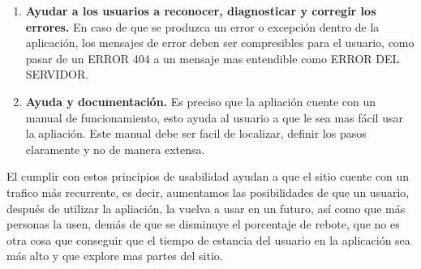 \begin{enumerate}
	\item \textbf{Ayudar a los usuarios a reconocer, diagnosticar y corregir los errores.} En caso de que se produzca un error o excepción dentro de la aplicación, los mensajes de error deben ser compresibles para el usuario, como pasar de un ERROR 404 a un mensaje mas entendible como ERROR DEL SERVIDOR.
	
	\item \textbf{Ayuda y documentación.} Es preciso que la apliación cuente con un manual de funcionamiento, esto ayuda al usuario a que le sea mas fácil usar la apliación. Este manual debe ser facil de localizar, definir los pasos claramente y no de manera extensa.
\end{enumerate}

El cumplir con estos principios de usabilidad ayudan a que el sitio cuente con un trafico más recurrente, es decir, aumentamos las posibilidades de que un usuario, después de utilizar la apliación, la vuelva a usar en un futuro, así como que más personas la usen, demás de que se disminuye el porcentaje de rebote, que no es otra cosa que conseguir que el tiempo de estancia del usuario en la aplicación sea más alto y que explore mas partes del sitio.


 



